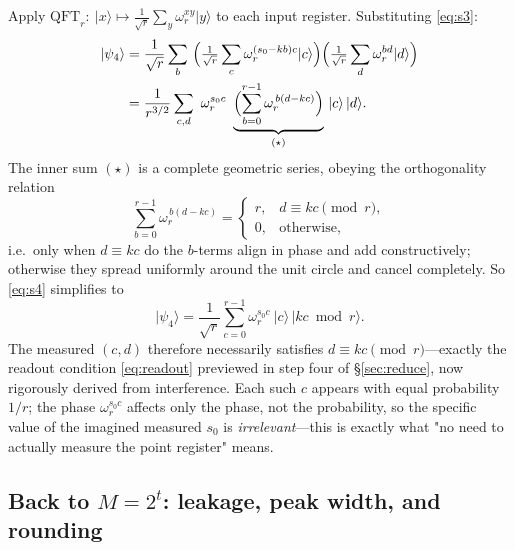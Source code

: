 \documentclass[11pt]{article}
\newcommand{\secref}[1]{\hyperref[#1]{\S\ref*{#1}}}
\begin{document}
Apply $\mathrm{QFT}_r:\ \lvert x\rangle\mapsto \tfrac{1}{\sqrt r}\sum_{y}\omega_r^{xy}\lvert y\rangle$ to each input register.
Substituting \eqref{eq:s3}:
\begin{align}
\lvert\psi_4\rangle
&=\frac{1}{\sqrt r}\sum_{b}\ \Bigl(\tfrac{1}{\sqrt r}\sum_{c}\omega_r^{(s_0-kb)c}\lvert c\rangle\Bigr)
\Bigl(\tfrac{1}{\sqrt r}\sum_{d}\omega_r^{bd}\lvert d\rangle\Bigr)\notag\\
&=\frac{1}{r^{3/2}}\sum_{c,d}\ \omega_r^{s_0 c}\ \underbrace{\Bigl(\sum_{b=0}^{r-1}\omega_r^{\,b(d-kc)}\Bigr)}_{(\star)}\ \lvert c\rangle\,\lvert d\rangle .
\label{eq:s4}
\end{align}
The inner sum $(\star)$ is a complete geometric series, obeying the orthogonality relation
\begin{equation}
\sum_{b=0}^{r-1}\omega_r^{\,b(d-kc)}=
\begin{cases}
r, & d\equiv kc \pmod r,\\[2pt]
0, & \text{otherwise,}
\end{cases}
\label{eq:orth}
\end{equation}
i.e.\ only when $d\equiv kc$ do the $b$-terms align in phase and add constructively; otherwise they spread uniformly around the unit circle and cancel completely. So \eqref{eq:s4} simplifies to
\begin{equation}
\lvert\psi_4\rangle=\frac{1}{\sqrt r}\sum_{c=0}^{r-1}\omega_r^{s_0 c}\ \bigl\lvert c\bigr\rangle\,\bigl\lvert kc \bmod r\bigr\rangle .
\label{eq:s5}
\end{equation}
The measured $(c,d)$ therefore necessarily satisfies $d\equiv kc\pmod r$---exactly the readout condition \eqref{eq:readout} previewed in step four of \secref{sec:reduce},
now rigorously derived from interference. Each such $c$ appears with equal probability $1/r$; the phase $\omega_r^{s_0 c}$
affects only the phase, not the probability, so the specific value of the imagined measured $s_0$ is \emph{irrelevant}---this is exactly what "no need to actually measure the point register" means.

\subsection{Back to $M=2^t$: leakage, peak width, and rounding}
\label{ssec:leak}
\end{document}
